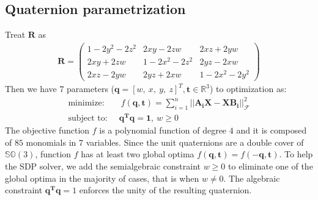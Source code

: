 \documentclass[a4paper]{report}
\begin{document}
\subsection{Quaternion parametrization}
Treat $\mathbf{R}$ as
\begin{align}
\mathbf{R}=\left(
\begin{matrix}
1 - 2 y^2 - 2 z^2 & 2 x y - 2 z w & 2 x z + 2 y w \\
2 x y + 2 z w & 1 - 2 x^2 - 2 z^2 & 2 y z - 2 x w \\
2 x z - 2 y w & 2 y z + 2 x w & 1 - 2 x^2 - 2 y^2
\end{matrix}
\right)
\end{align}
Then we have 7 parameters ($\mathbf{q}=[w,\ x,\ y,\ z]^T, \mathbf{t}\in \mathbb{R}^3$) to optimization as:
\begin{align}
\text{minimize: }\ &\ f(\mathbf{q, t})=\sum_{i=1}^{n} 
||\mathbf{A_iX-XB_i}||_{\mathcal{F}}^2 \\
\text{subject to: }\ & \mathbf{q^Tq=1},\ w \geq 0
\end{align}
The objective function $f$ is a polynomial function of degree $4$ and it is composed of $85$ monomials in $7$ variables. Since the unit quaternions are a double cover of $\mathbb{SO}(3)$, function $f$ has at least two global optima $f(\mathbf{q,t}) = f(\mathbf{-q,t})$. To help the SDP solver, we
add the semialgebraic constraint $w \geq 0$ to eliminate one of the global optima in the majority of cases, that is when $w \neq 0$. The algebraic constraint $\mathbf{q^Tq} = 1$ enforces the unity of the resulting quaternion.
\end{document}
